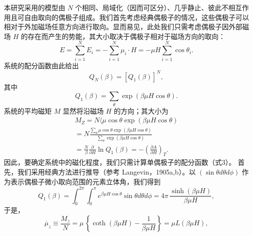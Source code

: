 本研究采用的模型由 \(N\) 个相同、局域化（因而可区分）、几乎静止、彼此不相互作用且可自由取向的偶极子组成。我们首先考虑经典偶极子的情况，这些偶极子可以相对于外加磁场任意方向进行取向。显而易见，此处我们只需考虑偶极子因外部磁场 \(H\) 的存在而产生的势能，其大小取决于偶极子相对于磁场方向的取向：
\begin{equation}\tag{3.5.83}\label{eq:3.5.83}
E = \sum _ { i = 1 } ^{N} E _ { i } = - \sum _ { i = 1 } ^{N} \mu _ { i } \cdot H = - \mu H \sum _ { i = 1 } ^{N} \cos \theta _ { i } .
\end{equation}
系统的配分函数由此给出
\begin{equation}\tag{3.5.84}\label{eq:3.5.84}
Q _ { N } ( \beta ) = [ Q _ { 1 } ( \beta ) ] ^{N} ,
\end{equation}
其中
\begin{equation}\tag{3.5.85}\label{eq:3.5.85}
Q _ { 1 } ( \beta ) = \sum _ { \theta } \exp ( \beta \mu H \cos \theta ) .
\end{equation}
系统的平均磁矩 \(M\) 显然将沿磁场 \(H\) 的方向；其大小为
\begin{equation}\tag{3.5.86}\label{eq:3.5.86}
\begin{array}{r} { M _ { Z } = N \langle \mu \cos \theta \exp ( \beta \mu H \cos \theta ) } \\{ = N \frac { \sum _ { \theta } \mu \cos \theta \exp ( \beta \mu H \cos \theta ) } { \sum _ { \theta } \exp ( \beta \mu H \cos \theta ) } } \\{ = \frac { N } { \beta } \frac { \partial } { \partial H } \ln Q _ { 1 } ( \beta ) = - \left( \frac { \partial A } { \partial H } \right) _ { T } . } \end{array}
\end{equation}
因此，要确定系统中的磁化程度，我们只需计算单偶极子的配分函数（式3）。
首先，我们采用经典方法进行推导（参考 Langevin，1905a,b）。以 \((\sin\theta d\theta d\phi)\) 作为表示偶极子微小取向范围的元素立体角，我们得到
\begin{equation}\tag{3.5.87}\label{eq:3.5.87}
Q _ { 1 } ( \beta ) = \int _ { 0 } ^{2 \pi} \int _ { 0 } ^{\pi} e ^{\beta \mu H \cos \theta} \sin \theta d \theta d \phi = 4 \pi \, \frac { \sinh ( \beta \mu H ) } { \beta \mu H } ,
\end{equation}
于是，
\begin{equation}\tag{3.5.88}\label{eq:3.5.88}
\overline { { \mu } } _ { z } \equiv \frac { M _ { z } } { N } = \mu \, \left\{ \coth ( \beta \mu H ) - \frac { 1 } { \beta \mu H } \right\} = \mu L ( \beta \mu H ) ,
\end{equation}
